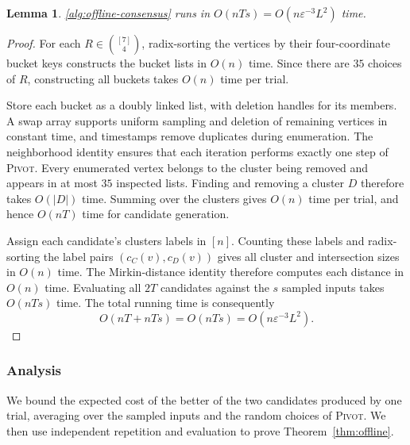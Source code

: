 \documentclass[11pt]{article}
\newtheorem{lemma}[theorem]{Lemma}
\theoremstyle{definition}
\theoremstyle{remark}
\newcommand{\1}{\mathbf{1}}
\begin{document}
\begin{lemma}
\label{lem:offline-running-time}
\cref{alg:offline-consensus} runs in
$O(nTs)=O(n\varepsilon^{-3}L^2)$ time.
\end{lemma}

\begin{proof}
For each $R\in\binom{[7]}{4}$, radix-sorting the vertices
by their four-coordinate bucket keys constructs the bucket
lists in $O(n)$ time. Since there are $35$ choices of $R$,
constructing all buckets takes $O(n)$ time per trial.

Store each bucket as a doubly linked list, with deletion
handles for its members. A swap array supports uniform
sampling and deletion of remaining vertices in constant
time, and timestamps remove duplicates during enumeration.
The neighborhood identity ensures that each iteration
performs exactly one step of \textsc{Pivot}. Every enumerated
vertex belongs to the cluster being removed and appears
in at most $35$ inspected lists. Finding and removing a
cluster $D$ therefore takes $O(|D|)$ time. Summing over
the clusters gives $O(n)$ time per trial, and hence
$O(nT)$ time for candidate generation.

Assign each candidate's clusters labels in $[n]$.
Counting these labels and radix-sorting the label pairs
$(c_C(v),c_D(v))$ gives all cluster and intersection sizes
in $O(n)$ time. The Mirkin-distance identity therefore
computes each distance in $O(n)$ time. Evaluating all
$2T$ candidates against the $s$ sampled inputs takes
$O(nTs)$ time. The total running time is consequently
\[
    O(nT+nTs)
        =O(nTs)
        =O(n\varepsilon^{-3}L^2).
\]
\end{proof}

\subsubsection{Analysis}
\label{subsec:offline-analysis}

We bound the expected cost of the better of the two candidates
produced by one trial, averaging over the sampled inputs and the
random choices of \textsc{Pivot}. We then use independent repetition
and evaluation to prove Theorem~\ref{thm:offline}.
\end{document}
